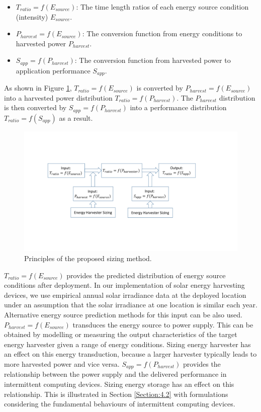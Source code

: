 \begin{itemize}
    \item $T_{ratio} = f(E_{source})$: The time length ratios of each energy source condition (intensity) $E_{source}$. 
    \item $P_{harvest} = f(E_{source})$: The conversion function from energy conditions to harvested power $P_{harvest}$. 
    \item $S_{app} = f(P_{harvest})$: The conversion function from harvested power to application performance $S_{app}$. 
\end{itemize}

As shown in Figure \ref{Figure:here}, $T_{ratio}= f(E_{source})$ is converted by $P_{harvest} = f(E_{source})$ into a harvested power distribution $T_{ratio} = f(P_{harvest})$. The $P_{harvest}$ distribution is then converted by $S_{app} = f(P_{harvest})$ into a performance distribution $T_{ratio} = f(S_{app})$ as a result. 

\begin{figure}[H]
    \centering
    \includegraphics[width=13cm]{figure/work1/sizingmethod}
    \caption{Principles of the proposed sizing method.}
    \label{Figure:here}
\end{figure}

$T_{ratio} = f(E_{source})$ provides the predicted distribution of energy source conditions after deployment. In our implementation of solar energy harvesting devices, we use empirical annual solar irradiance data at the deployed location under an assumption that the solar irradiance at one location is similar each year. Alternative energy source prediction methods for this input can be also used. $P_{harvest} = f(E_{source})$ transduces the energy source to power supply. This can be obtained by modelling or measuring the output characteristics of the target energy harvester given a range of energy conditions. Sizing energy harvester has an effect on this energy transduction, because a larger harvester typically leads to more harvested power and vice versa. $S_{app} = f(P_{harvest})$ provides the relationship between the power supply and the delivered performance in intermittent computing devices. Sizing energy storage has an effect on this relationship. This is illustrated in Section \ref{Section:4.2} with formulations considering the fundamental behaviours of intermittent computing devices. 

